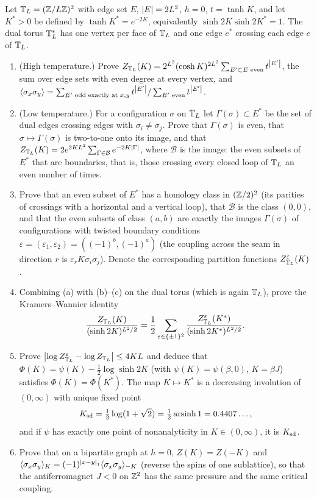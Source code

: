 \begin{exercise}
Let $\mathbb T_L=(\mathbb Z/L\mathbb Z)^2$ with edge set $E$, $\left\lvert E\right\rvert=2L^2$, $h=0$, $t=\tanh K$, and let
$K^*>0$ be defined by $\tanh K^*=e^{-2K}$, equivalently
$\sinh2K\sinh2K^*=1$.  The dual torus $\mathbb T_L^*$ has one vertex per face of
$\mathbb T_L$ and one edge $e^*$ crossing each edge $e$ of $\mathbb T_L$.
\begin{enumerate}[label=(\alph*)]
\item (High temperature.)  Prove
$Z_{\mathbb T_L}(K)=2^{L^2}(\cosh K)^{2L^2}\sum_{E'\subset E\text{ even}}t^{\left\lvert E'\right\rvert}$,
the sum over edge sets with even degree at every vertex, and
$\langle\sigma_x\sigma_y\rangle=\sum_{E'\text{ odd exactly at }x,y}t^{\left\lvert E'\right\rvert}/\sum_{E'\text{ even}}t^{\left\lvert E'\right\rvert}$.
\item (Low temperature.)  For a configuration $\sigma$ on $\mathbb T_L$ let
$\Gamma(\sigma)\subset E^*$ be the set of dual edges crossing edges with
$\sigma_i\ne\sigma_j$.  Prove that $\Gamma(\sigma)$ is even, that
$\sigma\mapsto\Gamma(\sigma)$ is two-to-one onto its image, and that
$Z_{\mathbb T_L}(K)=2e^{2KL^2}\sum_{\Gamma\in\mathcal B}e^{-2K\left\lvert \Gamma\right\rvert}$, where
$\mathcal B$ is the image: the even subsets of $E^*$ that are boundaries,
that is, those crossing every closed loop of $\mathbb T_L$ an even number of times.
\item Prove that an even subset of $E^*$ has a homology class in
$(\mathbb Z/2)^2$ (its parities of crossings with a horizontal and a vertical loop),
that $\mathcal B$ is the class $(0,0)$, and that the even subsets of class
$(a,b)$ are exactly the images $\Gamma(\sigma)$ of configurations with
twisted boundary conditions $\varepsilon=(\varepsilon_1,\varepsilon_2)=((-1)^b,(-1)^a)$
(the coupling across the seam in direction $r$ is $\varepsilon_rK\sigma_i\sigma_j$).
Denote the corresponding partition functions $Z^{\varepsilon}_{\mathbb T_L}(K)$.
\item Combining (a) with (b)--(c) on the dual torus (which is again $\mathbb T_L$),
prove the Kramers--Wannier identity
\[
 \frac{Z_{\mathbb T_L}(K)}{(\sinh2K)^{L^2/2}}=\frac12\sum_{\varepsilon\in\{\pm1\}^2}
 \frac{Z^{\varepsilon}_{\mathbb T_L}(K^*)}{(\sinh2K^*)^{L^2/2}} .
\]
\item Prove $\left\lvert \log Z^\varepsilon_{\mathbb T_L}-\log Z_{\mathbb T_L}\right\rvert\le4KL$ and deduce
that $\Phi(K)=\psi(K)-\tfrac12\log\sinh2K$ (with $\psi(K)=\psi(\beta,0)$,
$K=\beta J$) satisfies $\Phi(K)=\Phi(K^*)$.  The map $K\mapsto K^*$ is a
decreasing involution of $(0,\infty)$ with unique fixed point
\[
 K_{\rm sd}=\tfrac12\log(1+\sqrt2)=\tfrac12\operatorname{arsinh}1=0.4407\ldots ,
\]
and if $\psi$ has exactly one point of nonanalyticity in $K\in(0,\infty)$, it
is $K_{\rm sd}$.
\item Prove that on a bipartite graph at $h=0$, $Z(K)=Z(-K)$ and
$\langle\sigma_x\sigma_y\rangle_K=(-1)^{\left\lvert x-y\right\rvert_1}\langle\sigma_x\sigma_y\rangle_{-K}$
(reverse the spins of one sublattice), so that the antiferromagnet $J<0$ on
$\mathbb Z^2$ has the same pressure and the same critical coupling.
\end{enumerate}
\end{exercise}

